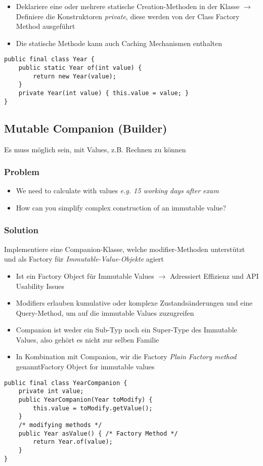 \begin{itemize}
    \item Deklariere eine oder mehrere statische Creation-Methoden in der Klasse $\rightarrow$ Definiere die Konstruktoren \textit{private}, diese werden von der Class Factory Method ausgeführt
    \item Die statische Methode kann auch Caching Mechanismen enthalten
\end{itemize}
\begin{lstlisting}
public final class Year {
    public static Year of(int value) {
        return new Year(value);
    }
    private Year(int value) { this.value = value; }
}
\end{lstlisting}

\subsection{Mutable Companion (Builder)}

Es muss möglich sein, mit Values, z.B. Rechnen zu können

\subsubsection{Problem}
\begin{itemize}
    \item We need to calculate with values \textit{e.g. 15 working days after exam}
    \item How can you simplify complex construction of an immutable value?
\end{itemize}

\subsubsection{Solution}

Implementiere eine Companion-Klasse, welche modifier-Methoden unterstützt und als Factory für \textit{Immutable-Value-Objekte} agiert

\begin{itemize}
    \item Ist ein Factory Object für Immutable Values $\rightarrow$ Adressiert Effizienz und API Usability Issues
    \item Modifiers erlauben kumulative oder komplexe Zustandsänderungen und eine Query-Method, um auf die immutable Values zuzugreifen
    \item Companion ist weder ein Sub-Typ noch ein Super-Type des Immutable Values, also gehört es nicht zur selben Familie
    \item In Kombination mit Companion, wir die Factory \textit{Plain Factory method} genanntFactory Object for immutable values
\end{itemize}
\begin{lstlisting}
public final class YearCompanion {
    private int value;
    public YearCompanion(Year toModify) {
        this.value = toModify.getValue();
    }
    /* modifying methods */
    public Year asValue() { /* Factory Method */
        return Year.of(value);
    }
}
\end{lstlisting}

